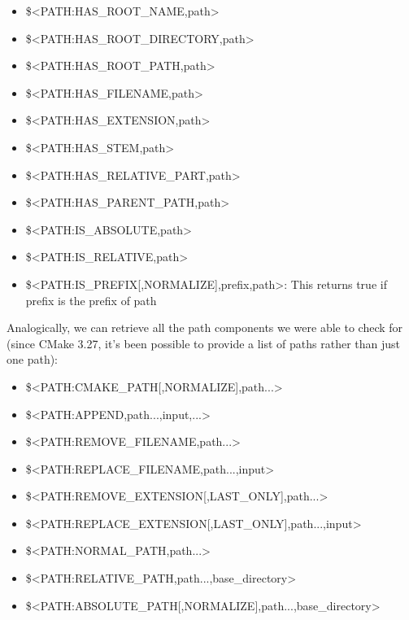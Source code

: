 \begin{itemize}
\item
\$<PATH:HAS\_ROOT\_NAME,path>

\item
\$<PATH:HAS\_ROOT\_DIRECTORY,path>

\item
\$<PATH:HAS\_ROOT\_PATH,path>

\item
\$<PATH:HAS\_FILENAME,path>

\item
\$<PATH:HAS\_EXTENSION,path>

\item
\$<PATH:HAS\_STEM,path>

\item
\$<PATH:HAS\_RELATIVE\_PART,path>

\item
\$<PATH:HAS\_PARENT\_PATH,path>

\item
\$<PATH:IS\_ABSOLUTE,path>

\item
\$<PATH:IS\_RELATIVE,path>

\item
\$<PATH:IS\_PREFIX[,NORMALIZE],prefix,path>: This returns true if prefix is the prefix of path
\end{itemize}

Analogically, we can retrieve all the path components we were able to check for (since CMake 3.27, it’s been possible to provide a list of paths rather than just one path):

\begin{itemize}
\item
\$<PATH:CMAKE\_PATH[,NORMALIZE],path...>

\item
\$<PATH:APPEND,path...,input,...>

\item
\$<PATH:REMOVE\_FILENAME,path...>

\item
\$<PATH:REPLACE\_FILENAME,path...,input>

\item
\$<PATH:REMOVE\_EXTENSION[,LAST\_ONLY],path...>

\item
\$<PATH:REPLACE\_EXTENSION[,LAST\_ONLY],path...,input>

\item
\$<PATH:NORMAL\_PATH,path...>

\item
\$<PATH:RELATIVE\_PATH,path...,base\_directory>

\item
\$<PATH:ABSOLUTE\_PATH[,NORMALIZE],path...,base\_directory>
\end{itemize}

